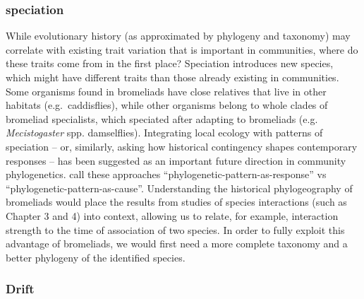 \subsubsection{speciation}\label{speciation}

While evolutionary history (as approximated by phylogeny and taxonomy)
may correlate with existing trait variation that is important in
communities, where do these traits come from in the first place?
Speciation introduces new species, which might have different traits
than those already existing in communities. Some organisms found in
bromeliads have close relatives that live in other habitats
(e.g.~caddisflies), while other organisms belong to whole clades of
bromeliad specialists, which speciated after adapting to bromeliads
(e.g. \emph{Mecistogaster} spp. damselflies). Integrating local ecology
with patterns of speciation -- or, similarly, asking how historical
contingency shapes contemporary responses -- has been suggested as an
important future direction in community phylogenetics.
\citep{gerhold2015} call these approaches
``phylogenetic-pattern-as-response'' vs
``phylogenetic-pattern-as-cause''. Understanding the historical
phylogeography of bromeliads would place the results from studies of
species interactions (such as Chapter 3 and 4) into context, allowing us
to relate, for example, interaction strength to the time of association
of two species. In order to fully exploit this advantage of bromeliads,
we would first need a more complete taxonomy and a better phylogeny of
the identified species.

\subsubsection{Drift}\label{drift}

